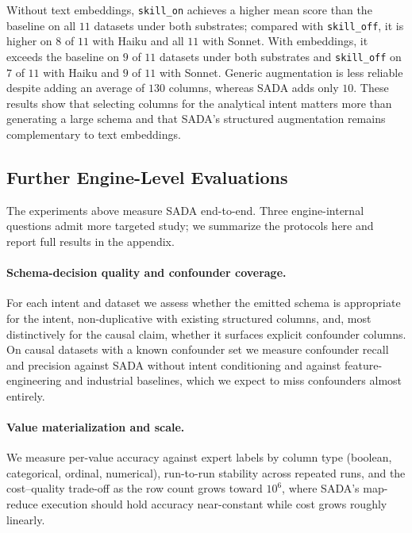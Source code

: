 Without text embeddings, \texttt{skill\_on} achieves a higher mean score than the baseline on all $11$ datasets under both substrates; compared with \texttt{skill\_off}, it is higher on $8$ of $11$ with Haiku and all $11$ with Sonnet. With embeddings, it exceeds the baseline on $9$ of $11$ datasets under both substrates and \texttt{skill\_off} on $7$ of $11$ with Haiku and $9$ of $11$ with Sonnet. Generic augmentation is less reliable despite adding an average of $130$ columns, whereas SADA adds only $10$. These results show that selecting columns for the analytical intent matters more than generating a large schema and that SADA's structured augmentation remains complementary to text embeddings.

\iffalse  %
\subsection{Further Engine-Level Evaluations}
\label{subsec:rq-further}

The experiments above measure SADA end-to-end. Three engine-internal questions admit more targeted study; we summarize the protocols here and report full results in the appendix.

\paragraph{Schema-decision quality and confounder coverage.}
\label{subsec:rq1}
For each intent and dataset we assess whether the emitted schema is appropriate for the intent, non-duplicative with existing structured columns, and, most distinctively for the causal claim, whether it surfaces explicit confounder columns. On causal datasets with a known confounder set we measure confounder recall and precision against SADA without intent conditioning and against feature-engineering and industrial baselines, which we expect to miss confounders almost entirely.

\paragraph{Value materialization and scale.}
We measure per-value accuracy against expert labels by column type (boolean, categorical, ordinal, numerical), run-to-run stability across repeated runs, and the cost--quality trade-off as the row count grows toward $10^6$, where SADA's map-reduce execution should hold accuracy near-constant while cost grows roughly linearly.

